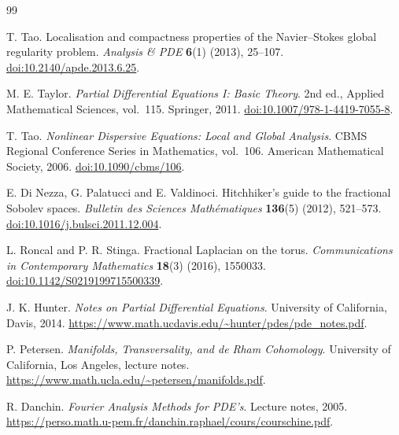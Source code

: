 \documentclass[11pt,a4paper]{article}
\begin{document}
\begin{thebibliography}{99}\small\raggedright
\setlength{\itemsep}{2pt}
\setlength{\parsep}{0pt}
\setlength{\parskip}{0pt}

T. Tao. Localisation and compactness properties of the Navier--Stokes global regularity problem. \emph{Analysis \& PDE} \textbf{6}(1) (2013), 25--107. \href{https://doi.org/10.2140/apde.2013.6.25}{doi:10.2140/apde.2013.6.25}.

M. E. Taylor. \emph{Partial Differential Equations I: Basic Theory}. 2nd ed., Applied Mathematical Sciences, vol.~115. Springer, 2011. \href{https://doi.org/10.1007/978-1-4419-7055-8}{doi:10.1007/978-1-4419-7055-8}.

T. Tao. \emph{Nonlinear Dispersive Equations: Local and Global Analysis}. CBMS Regional Conference Series in Mathematics, vol.~106. American Mathematical Society, 2006. \href{https://doi.org/10.1090/cbms/106}{doi:10.1090/cbms/106}.

E. Di Nezza, G. Palatucci and E. Valdinoci. Hitchhiker's guide to the fractional Sobolev spaces. \emph{Bulletin des Sciences Math\'ematiques} \textbf{136}(5) (2012), 521--573. \href{https://doi.org/10.1016/j.bulsci.2011.12.004}{doi:10.1016/j.bulsci.2011.12.004}.

L. Roncal and P. R. Stinga. Fractional Laplacian on the torus. \emph{Communications in Contemporary Mathematics} \textbf{18}(3) (2016), 1550033. \href{https://doi.org/10.1142/S0219199715500339}{doi:10.1142/S0219199715500339}.

J. K. Hunter. \emph{Notes on Partial Differential Equations}. University of California, Davis, 2014. \url{https://www.math.ucdavis.edu/~hunter/pdes/pde_notes.pdf}.

P. Petersen. \emph{Manifolds, Transversality, and de Rham Cohomology}. University of California, Los Angeles, lecture notes. \url{https://www.math.ucla.edu/~petersen/manifolds.pdf}.

R. Danchin. \emph{Fourier Analysis Methods for PDE's}. Lecture notes, 2005. \url{https://perso.math.u-pem.fr/danchin.raphael/cours/courschine.pdf}.
\end{thebibliography}
\end{document}
